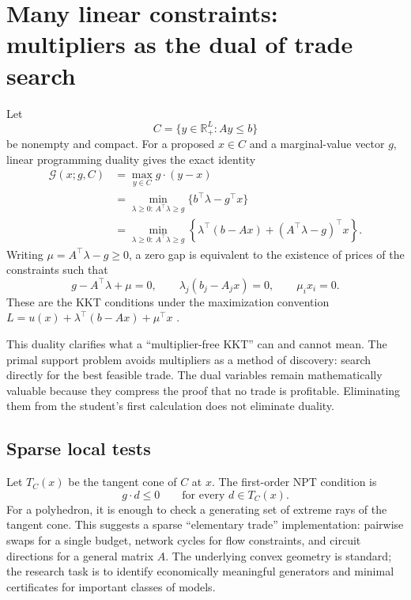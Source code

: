 \documentclass[11pt]{article}
\newcommand{\R}{\mathbb{R}}
\newcommand{\cG}{\mathcal{G}}
\theoremstyle{definition}
\theoremstyle{remark}
\begin{document}
\section{Many linear constraints: multipliers as the dual of trade search}

Let
\[
  C=\{y\in\R_+^L:Ay\le b\}
\]
be nonempty and compact.  For a proposed $x\in C$ and a marginal-value vector $g$, linear
programming duality gives the exact identity
\begin{align}
  \cG(x;g,C)
  &=\max_{y\in C}g\cdot(y-x)
  \label{eq:poly-primal}\\
  &=\min_{\lambda\ge0:\,A^\top\lambda\ge g}
       \{b^\top\lambda-g^\top x\}
  \label{eq:poly-dual}\\
  &=\min_{\lambda\ge0:\,A^\top\lambda\ge g}
       \left\{\lambda^\top(b-Ax)
       +(A^\top\lambda-g)^\top x\right\}.
  \label{eq:poly-decomp}
\end{align}
Writing $\mu=A^\top\lambda-g\ge0$, a zero gap is equivalent to the existence of prices
of the constraints such that
\[
  g-A^\top\lambda+\mu=0,\qquad
  \lambda_j(b_j-A_jx)=0,\qquad
  \mu_ix_i=0.
\]
These are the KKT conditions under the maximization convention
$L=u(x)+\lambda^\top(b-Ax)+\mu^\top x$ \cite{KuhnTucker1951}.

This duality clarifies what a ``multiplier-free KKT'' can and cannot mean.  The primal support
problem avoids multipliers as a method of discovery: search directly for the best feasible trade.
The dual variables remain mathematically valuable because they compress the proof that no trade
is profitable.  Eliminating them from the student's first calculation does not eliminate duality.

\subsection{Sparse local tests}

Let $T_C(x)$ be the tangent cone of $C$ at $x$.  The first-order NPT condition is
\[
  g\cdot d\le0\qquad\text{for every }d\in T_C(x).
\]
For a polyhedron, it is enough to check a generating set of extreme rays of the tangent cone.
This suggests a sparse ``elementary trade'' implementation: pairwise swaps for a single budget,
network cycles for flow constraints, and circuit directions for a general matrix $A$.  The
underlying convex geometry is standard; the research task is to identify economically meaningful
generators and minimal certificates for important classes of models.
\end{document}
